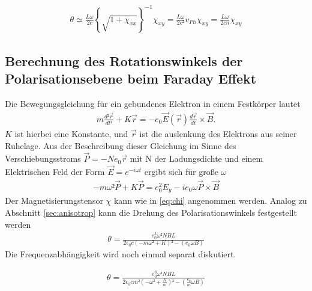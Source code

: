 \begin{align}
	\theta \simeq \frac{L \omega}{2c}\left\{ \sqrt{1+\chi_{xx}}\right\}^{-1} \chi_{xy} =\frac{L \omega}{2c²} v_{Ph} \chi_{xy} = \frac{L \omega}{2c n} \chi_{xy}
\end{align}

\subsection{Berechnung des Rotationswinkels der Polarisationsebene beim Faraday Effekt \cite{man_a} }
Die Bewegungsgleichung für ein gebundenes Elektron in einem Festkörper lautet
\begin{align}
	m \frac{d² \vec{r}}{d t²} + K \vec{r} = -e_0 \vec{E}(\vec{r}) \frac{d \vec{r}}{dt} \times \vec{B}.
\end{align}
$K$ ist hierbei eine Konstante, und $\vec{r}$ ist die auslenkung des Elektrons aus seiner Ruhelage.
Aus der Beschreibung dieser Gleichung im Sinne des Verschiebungsstroms $\vec{P} = -N e_0 \vec{r}$
mit N der Ladungsdichte
und einem Elektrischen Feld der Form $\vec{E} = e^{- i \omega t}$ ergibt sich für große $\omega$
\begin{align}
	-m\omega² \vec{P} + K \vec{P} = e_0^2 E_y -i e_0 \omega \vec{P} \times \vec{B}
\end{align}
Der Magnetisierungstensor $\chi$ kann wie in \eqref{eq:chi} angenommen werden. 
Analog zu Abschnitt \ref{sec:anisotrop} kann die Drehung des Polarisationswinkels festgestellt werden 
\begin{align} 
	\theta = \frac{e_0^3 \omega² NBL}{2 \epsilon_0 c(-m\omega²+ K)² -(e_0 \omega B)}
\end{align}
Die Frequenzabhängigkeit wird noch einmal separat diskutiert. 

\begin{align}
	\theta = \frac{e_0^3 \omega² NBL}{2 \epsilon_0 c m²(-\omega²+ \frac{K}{m})² -(\frac{e_0}{m}\omega B)}
\end{align}

